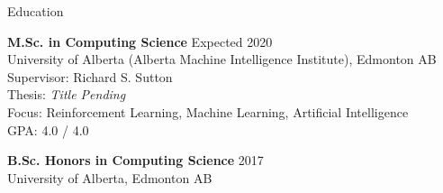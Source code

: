 \documentclass{cv}
\begin{document}

\begin{rSection}{Education}

{\bf M.Sc. in Computing Science} \hfill Expected 2020 \vspace{0.15em}\\
University of Alberta (Alberta Machine Intelligence Institute), Edmonton AB \vspace{0.15em}\\
Supervisor: Richard S. Sutton \vspace{0.15em}\\
Thesis: {\em Title Pending} \vspace{0.15em}\\
Focus: Reinforcement Learning, Machine Learning, Artificial Intelligence \vspace{0.15em}\\
GPA: 4.0 / 4.0


{\bf B.Sc. Honors in Computing Science} \hfill 2017 \vspace{0.15em}\\
University of Alberta, Edmonton AB

\end{rSection}

\end{document}
